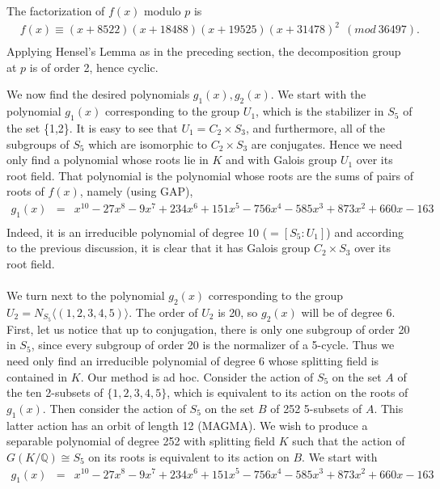 \documentclass[reqno,12pt]{amsart}
\theoremstyle{remark}
\theoremstyle{definition}
\theoremstyle{citing}
\numberwithin{theorem}{section}
\numberwithin{equation}{section}
\begin{document}
 The factorization of $f(x)$ modulo $p$ is  \begin{eqnarray*}
 & f(x)\equiv(x+8522)(x+18488)(x+19525)(x+31478)^{2}\ \ (mod\ 36497).\\
\end{eqnarray*}
Applying Hensel's Lemma as in the preceding section, the decomposition group at $p$ is of order 2, hence cyclic.

We now find the desired polynomials $g_1(x),g_2(x)$. We  start
with the polynomial $g_1(x)$ corresponding to the group $U_{1}$, which is the stabilizer in $S_{5}$ of the set \{1,2\}.
It is easy to see that $U_{1}=C_{2}\times S_{3}$, and furthermore, all
of the subgroups
 of $S_{5}$ which are isomorphic to $C_{2}\times S_{3}$ are conjugates.
Hence we need only  find a polynomial whose roots lie in $K$ and with Galois group $U_{1}$
over its root field. That polynomial is the polynomial whose roots
are the sums of pairs of roots of $f(x)$, namely (using GAP), \begin{eqnarray*}
g_{1}(x) & = & x^{10}-27x^{8}-9x^{7}+234x^{6}+151x^{5}-756x^{4}-585x^{3}+873x^{2}+660x-163\\
\end{eqnarray*}
Indeed, it is an irreducible polynomial of degree 10 ($=[S_5:U_1]$) and according
to the previous discussion, it is clear that it has Galois group $C_{2}\times S_{3}$
over its root field.\\
\\
We turn next to the polynomial $g_2(x)$ corresponding to the group $U_{2}=N_{S_{5}}\langle(1,2,3,4,5)\rangle$.
The order of $U_{2}$ is 20, so $g_2(x)$ will be of degree 6.  First, let us notice that up
to conjugation, there is only one subgroup of order 20 in $S_{5}$,
since every subgroup of order 20
is the normalizer of a 5-cycle.   Thus we need only find an irreducible polynomial
of degree 6 whose splitting field is contained in $K$.  Our method is ad hoc.
Consider the action of $S_5$ on the set $A$ of the ten 2-subsets of $\{1,2,3,4,5\}$, which is equivalent to its
action on the roots of $g_1(x)$.  Then consider the action of $S_5$ on the set $B$ of 252 5-subsets of $A$.  This latter action
has an orbit of length 12 (MAGMA).  
We wish to produce a separable polynomial of degree 252 with splitting field $K$ such that the action of $G(K/{{\mathbb{{Q}}}})\cong S_5$ on its roots is equivalent to its action on $B$.
We start with
 \begin{eqnarray*}
g_1(x) & = & x^{10}-27x^{8}-9x^{7}+234x^{6}+151x^{5}-756x^{4}-585x^{3}+873x^{2}+660x-163\\
\end{eqnarray*}
\end{document}
